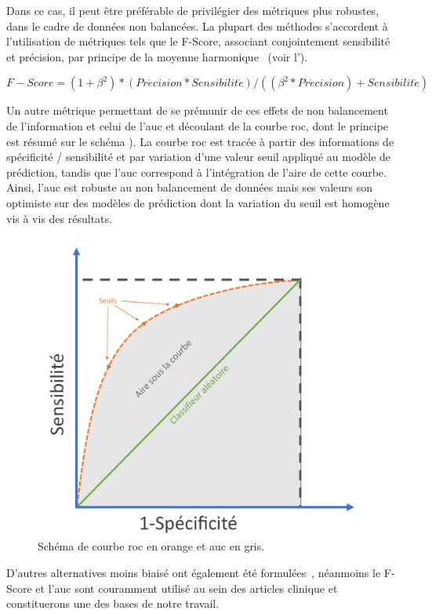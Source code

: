  Dans ce cas, il peut être préférable de privilégier des métriques plus robustes, dans le cadre de données non balancées. La plupart des méthodes s’accordent à l’utilisation de métriques tels que le F-Score, associant conjointement sensibilité et précision, par principe de la moyenne harmonique~\cite{Guo2008} (voir l').\par
 
\begin{equation} 
    {F-Score}=(1+\beta^2)*(Pr\acute{e}cision*Sensibilit\acute{e})/((\beta^2*Pr\acute{e}cision)+Sensibilit\acute{e})
    \label{eq:metrics_fscore}
\end{equation}
 
Un autre métrique permettant de se prémunir de ces effets de non balancement de l'information et celui de l'\acs{auc} et découlant de la courbe \gls{roc}, dont le principe est résumé sur le schéma ). La courbe \gls{roc} est tracée à partir des informations de spécificité / sensibilité et par variation d'une valeur seuil appliqué au modèle de prédiction, tandis que l'\acs{auc} correspond à l'intégration de l'aire de cette courbe. Ainsi, l'\acs{auc} est robuste au non balancement de données mais ses valeurs son optimiste sur des modèles de prédiction dont la variation du seuil est homogène vis à vis des résultats.\par

\begin{figure}[H]
    \centering
    \includegraphics[width=0.6\linewidth]{contents/chapter_3/resources/scheme_roc_curve.pdf}
    \caption{Schéma de courbe \gls{roc} en orange et \gls{auc} en gris.}
    \label{fig:scheme_roc_curve}
\end{figure}

D'autres alternatives moins biaisé ont également été formulées~\cite{Sokolova2006}, néanmoins le F-Score et l'\gls{auc} sont couramment utilisé au sein des articles clinique et constituerons une des bases de notre travail.\par

